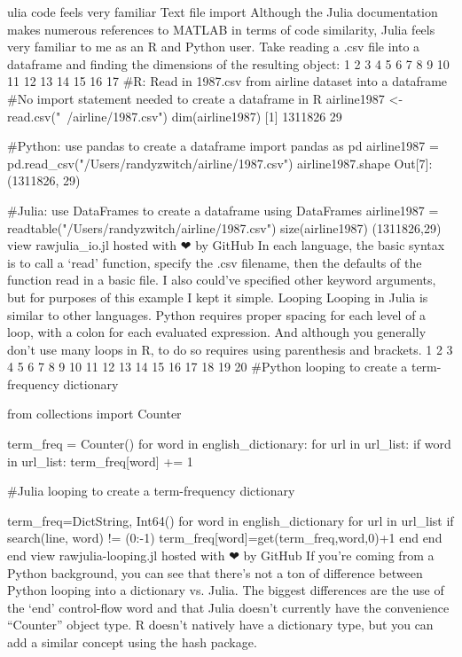 ulia code feels very familiar
Text file import
Although the Julia documentation makes numerous references to MATLAB in terms of code similarity, Julia feels very familiar to me as an R and Python user. Take reading a .csv file into a dataframe and finding the dimensions of the resulting object:
1
2
3
4
5
6
7
8
9
10
11
12
13
14
15
16
17
#R: Read in 1987.csv from airline dataset into a dataframe
#No import statement needed to create a dataframe in R
airline1987 <- read.csv("~/airline/1987.csv")
dim(airline1987)
[1] 1311826      29
 
#Python: use pandas to create a dataframe
import pandas as pd
airline1987 = pd.read_csv("/Users/randyzwitch/airline/1987.csv")
airline1987.shape
Out[7]: (1311826, 29)
 
#Julia: use DataFrames to create a dataframe
using DataFrames
airline1987 = readtable("/Users/randyzwitch/airline/1987.csv")
size(airline1987)
(1311826,29)
view rawjulia_io.jl hosted with ❤ by GitHub
In each language, the basic syntax is to call a ‘read’ function, specify the .csv filename, then the defaults of the function read in a basic file. I also could’ve specified other keyword arguments, but for purposes of this example I kept it simple.
Looping
Looping in Julia is similar to other languages. Python requires proper spacing for each level of a loop, with a colon for each evaluated expression. And although you generally don’t use many loops in R, to do so requires using parenthesis and brackets.
1
2
3
4
5
6
7
8
9
10
11
12
13
14
15
16
17
18
19
20
#Python looping to create a term-frequency dictionary
 
from collections import Counter
 
term_freq = Counter()
for word in english_dictionary:
  for url in url_list:
    if word in url_list:
      term_freq[word] += 1
 
#Julia looping to create a term-frequency dictionary
 
term_freq=Dict{String, Int64}()
for word in english_dictionary
    for url in url_list
        if search(line, word) != (0:-1)
            term_freq[word]=get(term_freq,word,0)+1
        end
    end
end
view rawjulia-looping.jl hosted with ❤ by GitHub
If you’re coming from a Python background, you can see that there’s not a ton of difference between Python looping into a dictionary vs. Julia. The biggest differences are the use of the ‘end’ control-flow word and that Julia doesn’t currently have the convenience “Counter” object type. R doesn’t natively have a dictionary type, but you can add a similar concept using the hash package.

